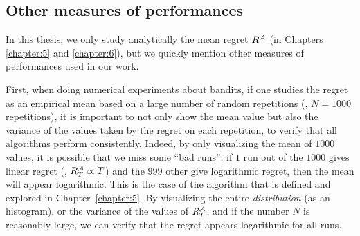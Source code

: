 \subsection{Other measures of performances}

In this thesis, we only study analytically the mean regret $R^{\mathcal{A}}$ (in Chapters \ref{chapter:5} and \ref{chapter:6}), but we quickly mention other measures of performances used in our work.

First, when doing numerical experiments about bandits, if one studies the regret as an empirical mean based on a large number of random repetitions (\eg, $N=1000$ repetitions), it is important to not only show the mean value but also the variance of the values taken by the regret on each repetition, to verify that all algorithms perform consistently.
Indeed, by only visualizing the mean of $1000$ values, it is possible that we miss some ``bad runs'': if $1$ run out of the $1000$ gives linear regret (\ie, $R_T^{\mathcal{A}} \propto T$) and the $999$ other give logarithmic regret, then the mean will appear logarithmic.
This is the case of the \Selfish{} algorithm that is defined and explored in Chapter~\ref{chapter:5}.
By visualizing the entire \emph{distribution} (as an histogram), or the variance of the values of $R_T^{\mathcal{A}}$, and if the number $N$ is reasonably large, we can verify that the regret appears logarithmic for all runs.


